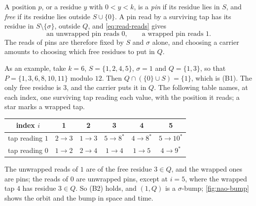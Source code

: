 A position $p$, or a residue $y$ with $0<y<k$, is a \emph{pin} if its residue
lies in $S$, and \emph{free} if its residue lies outside $S\cup\{0\}$. A pin
read by a surviving tap has its residue in $S\setminus\{\sigma\}$, outside $Q$, and
\eqref{eq:read-reads} gives
\begin{equation}
\text{an unwrapped pin reads } 0,\qquad
\text{a wrapped pin reads } 1.
\label{eq:read-pins}
\end{equation}
The reads of pins are therefore fixed by $S$ and $\sigma$ alone, and choosing
a carrier amounts to choosing which free residues to put in $Q$.

As an example, take $k=6$, $S=\{1,2,4,5\}$, $\sigma=1$ and $Q=\{1,3\}$, so
that $P=\{1,3,6,8,10,11\}$ modulo $12$. Then $Q\cap(\{0\}\cup S)=\{1\}$, which
is (B1). The only free residue is $3$, and the carrier puts it in $Q$. The
following table names, at each index, one surviving tap reading each value,
with the position it reads; a star marks a wrapped tap.
\begin{center}
\begin{tabular}{c|ccccc}
index $i$ & 1&2&3&4&5\\\hline
tap reading $1$ & $2\to3$ & $1\to3$ & $5\to8^*$ & $4\to8^*$ & $5\to10^*$\\
tap reading $0$ & $1\to2$ & $2\to4$ & $1\to4$ & $1\to5$ & $4\to9^*$
\end{tabular}
\end{center}
The unwrapped reads of $1$ are of the free residue $3\in Q$, and the wrapped
ones are pins; the reads of $0$ are unwrapped pins, except at $i=5$, where the
wrapped tap $4$ has residue $3\in Q$. So (B2) holds, and $(1,Q)$ is a
$\sigma$-bump; \autoref{fig:nao-bump} shows the orbit and the bump in space
and time.

